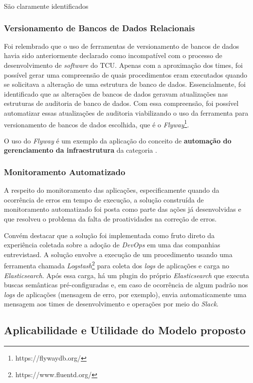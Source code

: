 São claramente identificados

\subsubsection{Versionamento de Bancos de Dados Relacionais}

Foi relembrado que o uso de ferramentas de versionamento de bancos de dados
havia sido anteriormente declarado como incompatível com o processo de
desenvolvimento de {\it software} do \acrshort{TCU}. Apenas com a aproximação
dos times, foi possível gerar uma compreensão de quais procedimentos eram
executados quando se solicitava a alteração de uma estrutura de banco de dados.
Essencialmente, foi identificado que as alterações de bancos de dados geravam
atualizações nas estruturas de auditoria de banco de dados. Com essa compreensão,
foi possível automatizar essas atualizações de auditoria viabilizando o uso
da ferramenta para versionamento de bancos de dados escolhida, que é o {\it Flyway}\footnote{https://flywaydb.org/}.

O uso do {\it Flyway} é um exemplo da aplicação do conceito de {\bf automação do
gerenciamento da infraestrutura} da categoria .

\subsubsection{Monitoramento Automatizado}

A respeito do monitoramento das aplicações, especificamente quando da ocorrência
de erros em tempo de execução, a solução construída de monitoramento automatizado
foi posta como parte das ações já desenvolvidas e que resolveu o problema da
falta de proatividades na correção de erros.

Convém destacar que a solução foi implementada como fruto direto da experiência
coletada sobre a adoção de {\it DevOps} em uma das companhias entrevistasd. A
solução envolve a execução de um procedimento usando uma ferramenta chamada
{\it Logstash}\footnote{https://www.fluentd.org/} para coleta dos {\it logs}
de aplicações e carga no {\it Elasticsearch}. Após essa carga, há um plugin do
próprio {\it Elasticsearch} que executa buscas semânticas pré-configuradas e,
em caso de ocorrência de algum padrão nos {\it logs} de aplicações (mensagem de
erro, por exemplo), envia automaticamente uma mensagem aos times de
desenvolvimento e operações por meio do {\it Slack}.

\subsection{Aplicabilidade e Utilidade do Modelo proposto}

